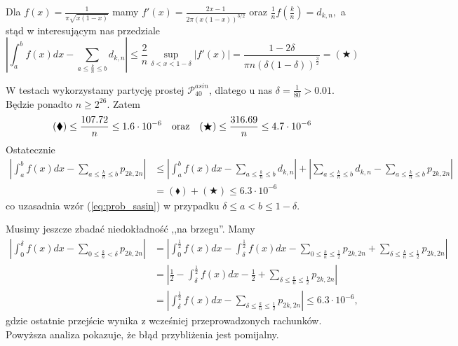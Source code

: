 \documentclass[a4paper,11pt,twoside]{book}
\theoremstyle{definition}
\begin{document}
Dla $f(x) = \frac{1}{\pi \sqrt{x(1-x)}}$ mamy $f'(x) = \frac{2x-1}{2 \pi (x(1-x))^{3/2}}$ oraz $\frac{1}{n}f\left(\frac{k}{n} \right) = d_{k,n}, $
a stąd w interesującym nas przedziale
\[  \left| \int_a^b f(x) dx - \sum\limits_{a \leq \frac{k}{n} \leq b}d_{k,n} \right| \leq \frac{2}{n} \sup_{\delta < x < 1-\delta} |f'(x)| = \frac{1 - 2\delta}{\pi n (\delta(1-\delta))^{\frac{3}{2}}} = (\bigstar) \]

W testach wykorzystamy partycję prostej $\mathcal{P}^{asin}_{40}$, dlatego u nas $\delta = \frac{1}{80} > 0.01$. Będzie ponadto $n \geq 2^{26}$. Zatem
\[    (\blacklozenge) \leq \frac{107.72}{n} \leq 1.6 \cdot 10^{-6}\ \ \hbox{ oraz }\ \ (\bigstar) \leq \frac{316.69}{n} \leq 4.7 \cdot 10^{-6}\]
Ostatecznie
\begin{equation*}
\begin{split}
\left| \int_a^b f(x) dx - \sum\limits_{a \leq \frac{k}{n} \leq b} p_{2k,2n} \right|
  &\leq \left| \int_a^b f(x) dx - \sum\limits_{a \leq \frac{k}{n} \leq b} d_{k,n} \right| +  \left| \sum\limits_{a \leq \frac{k}{n} \leq b} d_{k,n} - \sum\limits_{a \leq \frac{k}{n} \leq b} p_{2k,2n} \right| \\
  &= (\blacklozenge) + (\bigstar) \leq 6.3 \cdot 10^{-6}
\end{split} 
\end{equation*}
co uzasadnia wzór (\ref{eq:prob_sasin}) w przypadku $\delta \leq a < b \leq 1 - \delta$. 

Musimy jeszcze zbadać niedokładność ,,na brzegu''. Mamy
\begin{equation*}
\begin{split}
  \left| \int_0^\delta f(x) dx - \sum\limits_{0 \leq \frac{k}{n} < \delta} p_{2k,2n} \right| &= \left| \int_0^{\frac{1}{2}} f(x) dx -  \int_\delta^{\frac{1}{2}} f(x) dx - \sum\limits_{0 \leq \frac{k}{n} \leq \frac{1}{2}} p_{2k,2n} + \sum\limits_{\delta \leq \frac{k}{n} \leq \frac{1}{2}} p_{2k,2n} \right| \\
  &= \left| \frac{1}{2} -  \int_\delta^{\frac{1}{2}} f(x) dx - \frac{1}{2} + \sum\limits_{\delta \leq \frac{k}{n} \leq \frac{1}{2}} p_{2k,2n} \right| \\
  &= \left|\int_\delta^{\frac{1}{2}} f(x) dx - \sum\limits_{\delta \leq \frac{k}{n} \leq \frac{1}{2}} p_{2k,2n} \right| \leq 6.3 \cdot 10^{-6},
\end{split}
\end{equation*}
gdzie ostatnie przejście wynika z wcześniej przeprowadzonych rachunków. Powyższa analiza pokazuje, że błąd przybliżenia jest pomijalny.
\end{document}
